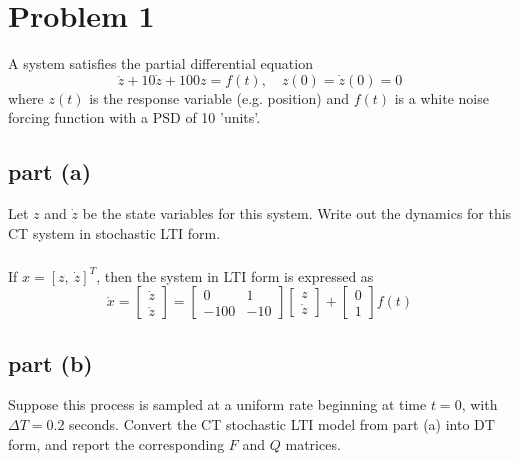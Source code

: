 \documentclass[11pt]{article}
\begin{document}
\thispagestyle{empty}

\newlength{\boxlength}\setlength{\boxlength}{\textwidth}
\addtolength{\boxlength}{-4mm}

\begin{center}
\end{center}

\section*{Problem 1}
A system satisfies the partial differential equation
\begin{equation*}
	\ddot{z}+10\dot{z}+100z=f(t), \quad z(0)=\dot{z}(0)=0
\end{equation*}
where $z(t)$ is the response variable (e.g. position) and $f(t)$ is a white noise forcing function with a PSD of 10 'units'.

\subsection*{part (a)}
Let $z$ and $\dot{z}$ be the state variables for this system. Write out the dynamics for this CT system in stochastic LTI form.

\subparagraph*{}
If $x=[z,\ \dot{z}]^T$, then the system in LTI form is expressed as
\begin{equation*}
	\dot{x} = \begin{bmatrix} \dot{z} \\ \ddot{z} \end{bmatrix} = \begin{bmatrix} 0 & 1 \\ -100 & -10 \end{bmatrix}\begin{bmatrix} z \\ \dot{z}\end{bmatrix} + \begin{bmatrix} 0 \\ 1 \end{bmatrix} f(t)
\end{equation*}

\subsection*{part (b)}
Suppose this process is sampled at a uniform rate beginning at time $t=0$, with $\Delta T=0.2$ seconds. Convert the CT stochastic LTI model from part (a) into DT form, and report the corresponding $F$ and $Q$ matrices.
\end{document}
